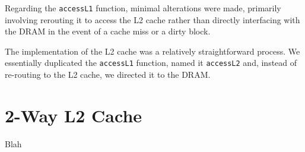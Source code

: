 \documentclass[12pt]{article}
\begin{document}
    Regarding the \texttt{accessL1} function, minimal alterations were made, primarily involving rerouting it to access the L2 cache rather than directly
    interfacing with the DRAM in the event of a cache miss or a dirty block.

    The implementation of the L2 cache was a relatively straightforward process. We essentially duplicated the \texttt{accessL1} function, named it \texttt{accessL2} and,
    instead of re-routing to the L2 cache, we directed it to the DRAM.

    \section{2-Way L2 Cache}

    Blah
\end{document}
